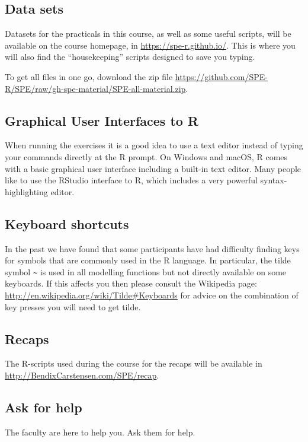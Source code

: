 
\subsection*{Data sets}

Datasets for the practicals in this course, as well as some useful \R
scripts, will be available on the course homepage, in
\url{https://spe-r.github.io/}. This is where you will
also find the ``housekeeping'' scripts designed to save you typing.

To get all files in one go, download the zip
file \url{https://github.com/SPE-R/SPE/raw/gh-spe-material/SPE-all-material.zip}.

\subsection*{Graphical User Interfaces to R}

When running the exercises it is a good idea to use a text editor
instead of typing your commands directly at the R prompt. On Windows
and macOS, R comes with a basic graphical user interface including a
built-in text editor. Many people like to use the RStudio interface to
R, which includes a very powerful syntax-highlighting editor.

\subsection*{Keyboard shortcuts}

In the past we have found that some participants have had difficulty
finding keys for symbols that are commonly used in the R language.  In
particular, the tilde symbol \verb+~+ is used in all modelling
functions but not directly available on some keyboards. If this
affects you then please consult the Wikipedia
page: \url{http://en.wikipedia.org/wiki/Tilde#Keyboards} for advice on
the combination of key presses you will need to get tilde.

\subsection*{Recaps}
The R-scripts used during the course for the recaps will be available
in \url{http://BendixCarstensen.com/SPE/recap}.

\subsection*{Ask for help}

The faculty are here to help you. Ask them for help.


